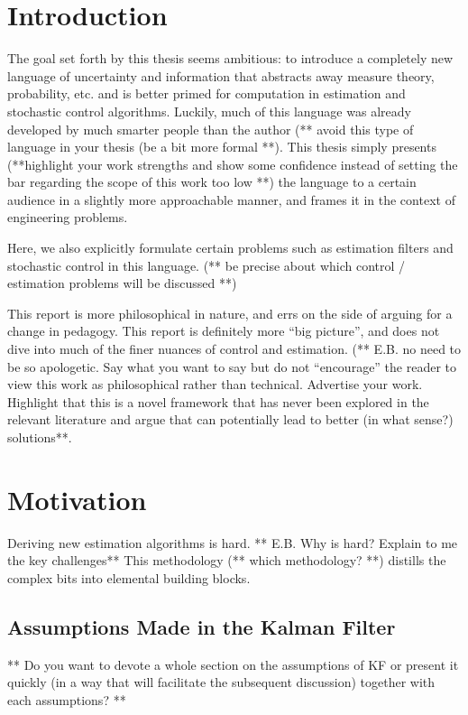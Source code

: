 \chapter{Introduction}

The goal set forth by this thesis seems ambitious: to introduce a completely new language of uncertainty and information that abstracts away measure theory, probability, etc. and is better primed for computation in estimation and stochastic control algorithms.
Luckily, much of this language was already developed by much smarter people than the author (** avoid this type of language in your thesis (be a bit more formal **). This thesis simply presents (**highlight your work strengths and show some confidence instead of setting the bar regarding the scope of this work too low **) the language to a certain audience in a slightly more approachable manner, and frames it in the context of engineering problems.

Here, we also explicitly formulate certain problems such as estimation filters and stochastic control in this language. (** be precise about which control / estimation problems will be discussed **) 

This report is more philosophical in nature, and errs on the side of arguing for a change in pedagogy.
This report is definitely more ``big picture'', and does not dive into much of the finer nuances of control and estimation. (** E.B. no need to be so apologetic. Say what you want to say but do not ``encourage'' the reader to view this work as philosophical rather than technical. Advertise your work. Highlight that this is a novel framework that has never been explored in the relevant literature and argue that can potentially lead to better (in what sense?) solutions**.


\chapter{Motivation}

Deriving new estimation algorithms is hard. ** E.B. Why is hard? Explain to me the key challenges** 
This methodology (** which methodology? **) distills the complex bits into elemental building blocks.


\section{Assumptions Made in the Kalman Filter}
** Do you want to devote a whole section on the assumptions of KF or present it quickly (in  a way that will facilitate the subsequent discussion) together with each assumptions? ** 

